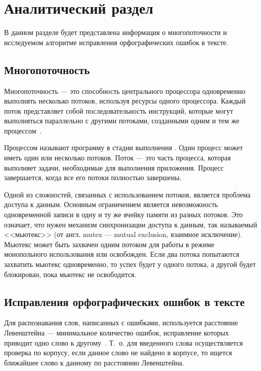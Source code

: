 \chapter{Аналитический раздел}

В данном разделе будет представлена информация о многопоточности и исследуемом алгоритме исправления орфографических ошибок в тексте.

\section{Многопоточность} 

Многопоточность --- это способность центрального процессора одновременно выполнять несколько потоков, используя ресурсы одного процессора. Каждый поток представляет собой последовательность инструкций, которые могут выполняться параллельно с другими потоками, созданными одним и тем же процессом~\cite{multithreading}.

Процессом называют программу в стадии выполнения \cite{process}. Один процесс может иметь один или несколько потоков. Поток --- это часть процесса, которая выполняет задачи, необходимые для выполнения приложения. Процесс завершается, когда все его потоки полностью завершены. 

Одной из сложностей, связанных с использованием потоков, является проблема доступа к данным. 
Основным ограничением является невозможность одновременной записи в одну и ту же ячейку памяти из разных потоков.
Это означает, что нужен механизм синхронизации доступа к данным, так называемый <<мьютекс>> (от англ. mutex --- mutual exclusion, взаимное исключение). 
Мьютекс может быть захвачен одним потоком для работы в режиме монопольного использования или освобожден. Если два потока попытаются захватить мьютекс одновременно, то успех будет у одного потока, а другой будет блокирован, пока мьютекс не освободится.

\section{Исправления орфографических ошибок в тексте}

Для распознавания слов, написанных с ошибками, используется расстояние
Левенштейна --- минимальное количество ошибок, исправление которых приводит
одно слово к другому~\cite{miem}. 
Т.~о. для введенного слова осуществляется проверка по корпусу, если данное слово не найдено в корпусе, то ищется ближайшее слово к данному по расстоянию Левенштейна. 


